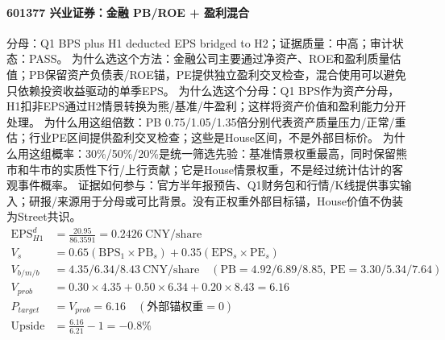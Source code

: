 \paragraph{601377 兴业证券：金融 PB/ROE + 盈利混合}
分母：Q1 BPS plus H1 deducted EPS bridged to H2；证据质量：中高；审计状态：PASS。
为什么选这个方法：金融公司主要通过净资产、ROE和盈利质量估值；PB保留资产负债表/ROE锚，PE提供独立盈利交叉检查，混合使用可以避免只依赖投资收益驱动的单季EPS。
为什么选这个分母：Q1 BPS作为资产分母，H1扣非EPS通过H2情景转换为熊/基准/牛盈利；这样将资产价值和盈利能力分开处理。
为什么用这组倍数：PB 0.75/1.05/1.35倍分别代表资产质量压力/正常/重估；行业PE区间提供盈利交叉检查；这些是House区间，不是外部目标价。
为什么用这组概率：30\%/50\%/20\%是统一筛选先验：基准情景权重最高，同时保留熊市和牛市的实质性下行/上行贡献；它是House情景权重，不是经过统计估计的客观事件概率。
证据如何参与：官方半年报预告、Q1财务包和行情/K线提供事实输入；研报/来源用于分母或可比背景。没有正权重外部目标锚，House价值不伪装为Street共识。
\begin{align*}
\mathrm{EPS}_{H1}^d &= \frac{20.95}{86.3591} = 0.2426\ \mathrm{CNY/share}\\
V_s &= 0.65\left(\mathrm{BPS}_1\times \mathrm{PB}_s\right)+0.35\left(\mathrm{EPS}_s\times \mathrm{PE}_s\right)\\
V_{b/m/b} &= 4.35/6.34/8.43\ \mathrm{CNY/share}\quad(\mathrm{PB}=4.92/6.89/8.85,\ \mathrm{PE}=3.30/5.34/7.64)\\
V_{prob} &= 0.30\times 4.35+0.50\times 6.34+0.20\times 8.43=6.16\\
P_{target} &= V_{prob}=6.16\quad(\text{外部锚权重}=0)\\
\mathrm{Upside} &= \frac{6.16}{6.21}-1=-0.8\%\\
\end{align*}

